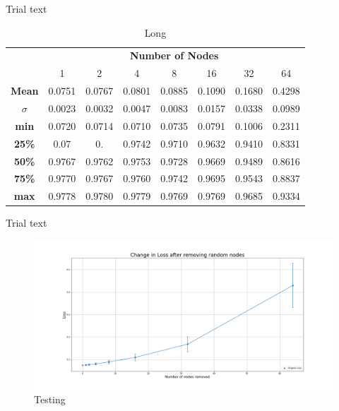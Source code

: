 \documentclass[UKenglish]{ifimaster}
\begin{document}
            Trial text

            \begin{table}[h!]
                \centering
                \begin{tabular}{c | c c c c c c c}
                    & \multicolumn{7}{c}{\textbf{Number of Nodes}} \\
                    \cline{2-8}
                    & 1 & 2 & 4 & 8 & 16 & 32 & 64 \\
                    \hline
                    \textbf{Mean} & 0.0751 & 0.0767 & 0.0801 & 0.0885 & 0.1090 & 0.1680 & 0.4298 \\
                    \textbf{$\sigma$} & 0.0023 & 0.0032 & 0.0047 & 0.0083 & 0.0157 & 0.0338 & 0.0989 \\
                    \textbf{min} & 0.0720 & 0.0714 & 0.0710 & 0.0735 & 0.0791 & 0.1006 & 0.2311 \\
                    \textbf{25\%} & 0.07 & 0. & 0.9742 & 0.9710 & 0.9632 & 0.9410 & 0.8331 \\
                    \textbf{50\%} & 0.9767 & 0.9762 & 0.9753 & 0.9728 & 0.9669 & 0.9489 & 0.8616 \\
                    \textbf{75\%} & 0.9770 & 0.9767 & 0.9760 & 0.9742 & 0.9695 & 0.9543 & 0.8837 \\
                    \textbf{max} & 0.9778 & 0.9780 & 0.9779 & 0.9769 & 0.9769 & 0.9685 & 0.9334 \\
                    
                \end{tabular}
                \caption[Short]{Long}
            \end{table}

            Trial text

            \begin{figure}[h!]\centering
                \includegraphics[width=\textwidth]{Loss_change_random_removal_mnist.png}
                \caption[Short title]{Testing}
                \label{fig:loss_rn_mnist}
            \end{figure}
\end{document}
